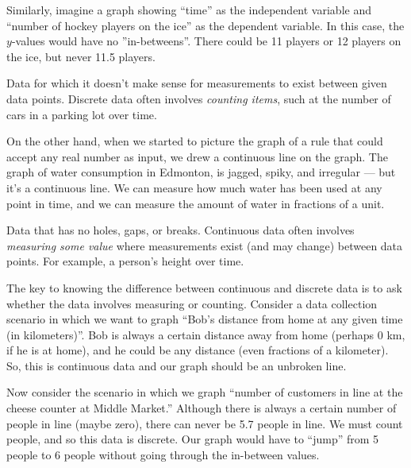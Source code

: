 Similarly, imagine a graph showing ``time'' as the independent variable and ``number of hockey players on the ice'' as the dependent variable. In this case, the $y$-values would have no ''in-betweens''. There could be 11 players or 12 players on the ice, but never 11.5 players.

\begin{boxeddef}
Data for which it doesn't make sense for measurements to exist between given data points. Discrete data often involves \textit{counting items}, such at the number of cars in a parking lot over time. 
\end{boxeddef}

On the other hand, when we started to picture the graph of a rule that could accept any real number as input, we drew a continuous line on the graph. The graph of water consumption in Edmonton, is jagged, spiky, and irregular --- but it's a continuous line. We can measure how much water has been used at any point in time, and we can measure the amount of water in fractions of a unit.

\begin{boxeddef}
Data that has no holes, gaps, or breaks. Continuous data often involves \textit{measuring some value} where measurements exist (and may change) between data points. For example, a person's height over time.
\end{boxeddef}


The key to knowing the difference between continuous and discrete data is to ask whether the data involves measuring or counting. Consider a data collection scenario in which we want to graph ``Bob's distance from home at any given time (in kilometers)''. Bob is always a certain distance away from home (perhaps 0 km, if he is at home), and he could be any distance (even fractions of a kilometer). So, this is continuous data and our graph should be an unbroken line.

Now consider the scenario in which we graph ``number of customers in line at the cheese counter at Middle Market.'' Although there is always a certain number of people in line (maybe zero), there can never be 5.7 people in line. We must count people, and so this data is discrete. Our graph would have to ``jump'' from 5 people to 6 people without going through the in-between values.

